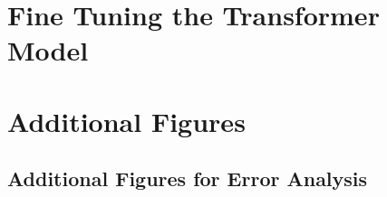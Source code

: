 \chapter{Fine Tuning the Transformer Model}
\label{appendix:transformer-hyperparameter-tuning}


\chapter{Additional Figures}
\label{appendix:additional-figures}

\section{Additional Figures for Error Analysis}
\label{appendix:error-analysis-figures}

\section{}